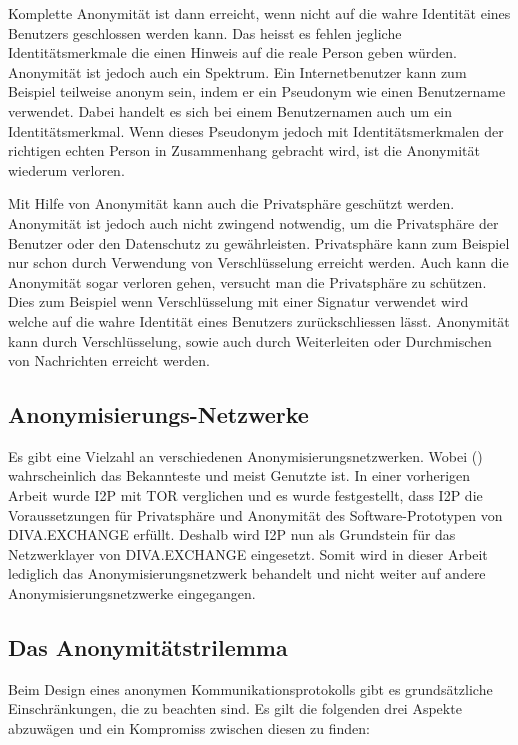 Komplette Anonymität ist dann erreicht, wenn nicht auf die wahre Identität eines Benutzers geschlossen werden kann.
Das heisst es fehlen jegliche Identitätsmerkmale die einen Hinweis auf die reale Person geben würden.
Anonymität ist jedoch auch ein Spektrum.
Ein Internetbenutzer kann zum Beispiel teilweise anonym sein, indem er ein Pseudonym wie einen Benutzername verwendet.
Dabei handelt es sich bei einem Benutzernamen auch um ein Identitätsmerkmal.
Wenn dieses Pseudonym jedoch mit Identitätsmerkmalen der richtigen echten Person in Zusammenhang gebracht wird,
ist die Anonymität wiederum verloren. \parencite[S. 8-9]{maric_untersuchung_2020}

Mit Hilfe von Anonymität kann auch die Privatsphäre geschützt werden.
Anonymität ist jedoch auch nicht zwingend notwendig, um die Privatsphäre der Benutzer oder den Datenschutz zu gewährleisten.
Privatsphäre kann zum Beispiel nur schon durch Verwendung von Verschlüsselung erreicht werden.
Auch kann die Anonymität sogar verloren gehen, versucht man die Privatsphäre zu schützen.
Dies zum Beispiel wenn Verschlüsselung mit einer Signatur verwendet wird welche auf die wahre Identität eines Benutzers zurückschliessen lässt.
Anonymität kann durch Verschlüsselung, sowie auch durch Weiterleiten oder Durchmischen von Nachrichten erreicht werden.

\subsection{Anonymisierungs-Netzwerke}

Es gibt eine Vielzahl an verschiedenen Anonymisierungsnetzwerken.
Wobei  () wahrscheinlich das Bekannteste und meist Genutzte ist.
In einer vorherigen Arbeit wurde I2P mit TOR verglichen und es wurde festgestellt, dass I2P die Voraussetzungen für Privatsphäre und Anonymität des Software-Prototypen von DIVA.EXCHANGE \parencite[S.~28-30]{maric_untersuchung_2020} erfüllt.
Deshalb wird I2P nun als Grundstein für das Netzwerklayer von DIVA.EXCHANGE eingesetzt.
Somit wird in dieser Arbeit lediglich das Anonymisierungsnetzwerk  behandelt und nicht weiter auf andere Anonymisierungsnetzwerke eingegangen.

\subsection{Das Anonymitätstrilemma}\label{sec:anonymitytrilemma}

Beim Design eines anonymen Kommunikationsprotokolls gibt es grundsätzliche Einschränkungen, die zu beachten sind.
Es gilt die folgenden drei Aspekte abzuwägen und ein Kompromiss zwischen diesen zu finden:

